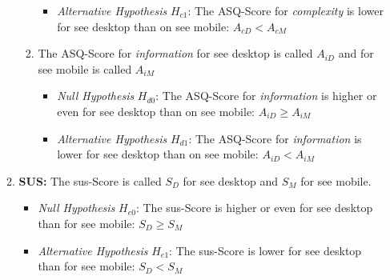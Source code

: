 \begin{enumerate}[{label=\alph*)}]
\begin{enumerate}[label=\roman*)]
\begin{enumerate}[{label=\arabic*)}]
\begin{itemize}
                          \item \textit{Alternative Hypothesis} $H_{c1}$: The \gls{ASQ}-Score for \textit{complexity} is lower for \gls{see} desktop than on \gls{see} mobile: $A_{cD} < A_{cM}$
                        \end{itemize}
                  \item The \gls{ASQ}-Score for \textit{information} for \gls{see} desktop is called $A_{iD}$ and for \gls{see} mobile is called $A_{iM}$
                        \begin{itemize}
                          \item \textit{Null Hypothesis} $H_{d0}$: The \gls{ASQ}-Score for \textit{information} is higher or even for \gls{see} desktop than on \gls{see} mobile: $A_{iD} \geq A_{iM}$
                          \item \textit{Alternative Hypothesis} $H_{d1}$: The \gls{ASQ}-Score for \textit{information} is lower for \gls{see} desktop than on \gls{see} mobile: $A_{iD} < A_{iM}$
                        \end{itemize}
                \end{enumerate}

          \item \textbf{SUS:} The \gls{sus}-Score is called $S_D$ for \gls{see} desktop and $S_M$ for \gls{see} mobile.
                \begin{itemize}
                  \item \textit{Null Hypothesis} $H_{e0}$: The \gls{sus}-Score is higher or even for \gls{see} desktop than for \gls{see} mobile: $S_D \geq S_M$
                  \item \textit{Alternative Hypothesis} $H_{e1}$: The \gls{sus}-Score is lower for \gls{see} desktop than for \gls{see} mobile: $S_D < S_M$
                \end{itemize}
        \end{enumerate}
\end{enumerate}

